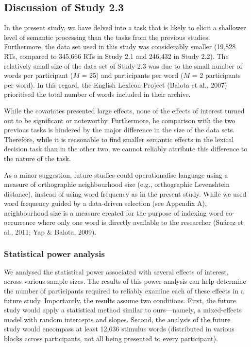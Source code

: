 \documentclass[
  12pt,
  man,floatsintext]{apa7}
\begin{document}
\hypertarget{discussion-of-study-2.3}{%
\subsection{Discussion of Study 2.3}\label{discussion-of-study-2.3}}

In the present study, we have delved into a task that is likely to elicit a shallower level of semantic processing than the tasks from the previous studies. Furthermore, the data set used in this study was considerably smaller (19,828 RTs, compared to 345,666 RTs in Study 2.1 and 246,432 in Study 2.2). The relatively small size of the data set of Study 2.3 was due to the small number of words per participant (\(M\) = 25) and participants per word (\(M\) = 2 participants per word). In this regard, the English Lexicon Project (Balota et al., 2007) prioritised the total number of words included in their archive.

While the covariates presented large effects, none of the effects of interest turned out to be significant or noteworthy. Furthermore, he comparison with the two previous tasks is hindered by the major difference in the size of the data sets. Therefore, while it is reasonable to find smaller semantic effects in the lexical decision task than in the other two, we cannot reliably attribute this difference to the nature of the task.

As a minor suggestion, future studies could operationalise language using a measure of orthographic neighbourhood size (e.g., orthographic Levenshtein distance), instead of using word frequency as in the present study. While we used word frequency guided by a data-driven selection (see Appendix A), neighbourhood size is a measure created for the purpose of indexing word co-occurrence where only one word is directly available to the researcher (Suárez et al., 2011; Yap \& Balota, 2009).

\hypertarget{statistical-power-analysis-7}{%
\subsubsection{Statistical power analysis}\label{statistical-power-analysis-7}}

We analysed the statistical power associated with several effects of interest, across various sample sizes. The results of this power analysis can help determine the number of participants required to reliably examine each of these effects in a future study. Importantly, the results assume two conditions. First, the future study would apply a statistical method similar to ours---namely, a mixed-effects model with random intercepts and slopes. Second, the analysis of the future study would encompass at least 12,636 stimulus words (distributed in various blocks across participants, not all being presented to every participant).
\end{document}
